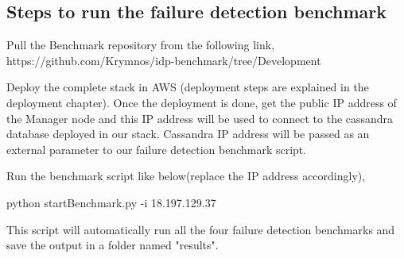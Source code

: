 \subsection{Steps to run the failure detection benchmark}


Pull the Benchmark repository from the following link,
https://github.com/Krymnos/idp-benchmark/tree/Development

Deploy the complete stack in AWS (deployment steps are explained in the deployment chapter). Once the deployment is done, get the public IP address of the Manager node and this IP address will be used to connect to the cassandra database deployed in our stack. Cassandra IP address will be passed as an external parameter to our failure detection benchmark script.

Run the benchmark script like below(replace the IP address accordingly),

\begin{center}
    python startBenchmark.py -i 18.197.129.37
\end{center}

This script will automatically run all the four failure detection benchmarks and save the output in a folder named "results".


